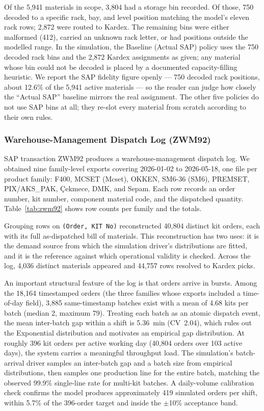 

Of the 5,941 materials in scope, 3,804 had a storage bin recorded. Of those, 750 decoded to a specific rack, bay, and level position matching the model's eleven rack rows; 2,872 were routed to Kardex. The remaining bins were either malformed (412), carried an unknown rack letter, or had positions outside the modelled range. In the simulation, the Baseline (Actual SAP) policy uses the 750 decoded rack bins and the 2,872 Kardex assignments as given; any material whose bin could not be decoded is placed by a documented capacity-filling heuristic. We report the SAP fidelity figure openly — 750 decoded rack positions, about 12.6\% of the 5,941 active materials — so the reader can judge how closely the ``Actual SAP'' baseline mirrors the real assignment. The other five policies do not use SAP bins at all; they re-slot every material from scratch according to their own rules.

\subsubsection{Warehouse-Management Dispatch Log (ZWM92)}

SAP transaction ZWM92 produces a warehouse-management dispatch log. We obtained nine family-level exports covering 2026-01-02 to 2026-05-18, one file per product family: F400, MCSET (Mcset), OKKEN, SM6-36 (SM6), PREMSET, PIX/AKS\_PAK, Çekmece, DMK, and Sepam. Each row records an order number, kit number, component material code, and the dispatched quantity. Table~\ref{tab:zwm92} shows row counts per family and the totals.



Grouping rows on \texttt{(Order, KIT No)} reconstructed 40,804 distinct kit orders, each with its full as-dispatched bill of materials. This reconstruction has two uses: it is the demand source from which the simulation driver's distributions are fitted, and it is the reference against which operational validity is checked. Across the log, 4,036 distinct materials appeared and 44,757 rows resolved to Kardex picks.

An important structural feature of the log is that orders arrive in bursts. Among the 18,164 timestamped orders (the three families whose exports included a time-of-day field), 3,885 same-timestamp batches exist with a mean of 4.68 kits per batch (median 2, maximum 79). Treating each batch as an atomic dispatch event, the mean inter-batch gap within a shift is 5.36~min (CV~2.04), which rules out the Exponential distribution and motivates an empirical gap distribution. At roughly 396 kit orders per active working day (40,804 orders over 103 active days), the system carries a meaningful throughput load. The simulation's batch-arrival driver samples an inter-batch gap and a batch size from empirical distributions, then samples one production line for the entire batch, matching the observed 99.9\% single-line rate for multi-kit batches. A daily-volume calibration check confirms the model produces approximately 419 simulated orders per shift, within 5.7\% of the 396-order target and inside the $\pm$10\% acceptance band.

